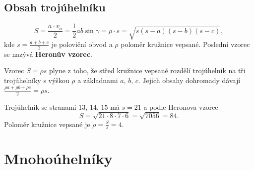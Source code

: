 \subsection{Obsah trojúhelníku}\label{sec:obsah-trojuhelniku}

\begin{definitionbox}
  \begin{equation*}
    S = \frac{a\cdot v_a}{2} = \frac{1}{2}ab\sin\gamma = \rho\cdot s = \sqrt{s(s - a)(s - b)(s - c)},
  \end{equation*}
  kde $s = \frac{a + b + c}{2}$ je poloviční obvod a $\rho$ poloměr kružnice vepsané. Poslední vzorec se nazývá \textbf{Heronův vzorec}.
\end{definitionbox}

Vzorec $S = \rho s$ plyne z toho, že střed kružnice vepsané rozdělí trojúhelník na tři trojúhelníky s výškou $\rho$ a základnami $a$, $b$, $c$. Jejich obsahy dohromady dávají $\frac{\rho a + \rho b + \rho c}{2} = \rho s$.
\begin{center}
\end{center}

\begin{example}
  Trojúhelník se stranami $13$, $14$, $15$ má $s = 21$ a podle Heronova vzorce
  \begin{equation*}
    S = \sqrt{21\cdot 8\cdot 7\cdot 6} = \sqrt{7056} = 84.
  \end{equation*}
  Poloměr kružnice vepsané je $\rho = \frac{S}{s} = 4$.
\end{example}

\section{Mnohoúhelníky}\label{sec:mnohouhelniky}

